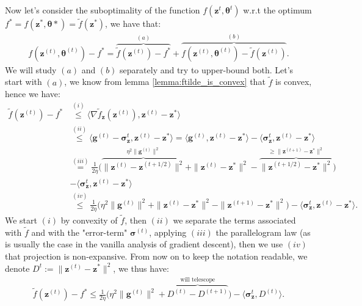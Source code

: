 Now let's consider the suboptimality of the function $f(\bm{z}^{t},\bm{\theta}^t)$ w.r.t the optimum $f^*=f(\bm{z}^*,\bm{\theta}*)=\tilde{f}(\bm{z}^{*})$, we have that:
\begin{align*}
    f(\bm{z}^{(t)},\bm{\theta}^{(t)}) - f^* = 
    \overbrace{\tilde{f}(\bm{z}^{(t)}) - f^* }^{(a)}
    + \overbrace{f(\bm{z}^{(t)},\bm{\theta}^{(t)}) - \tilde{f}(\bm{z}^{(t)})}^{(b)}.
\end{align*}
We will study $(a)$ and $(b)$ separately and try to upper-bound both. Let's start with $(a)$, we know from lemma \ref{lemma:ftilde_is_convex} that $\tilde{f}$ is convex, hence we have:
\begin{align*}
    \tilde{f}(\bm{z}^{(t)}) - f^* & \stackrel{(i)}{\leq} 
     \langle  \nabla \tilde{f}_{\bm{z}} (\bm{z}^{(t)}) 
    , \bm{z}^{(t)} - \bm{z}^* \rangle \\
    & \stackrel{(ii)}{\leq} 
    \langle  \bm{g}^{(t)} -\bm{\sigma}_{\bm{z}}^{t}
    , \bm{z}^{(t)} - \bm{z}^* \rangle 
    = 
    \langle  \bm{g}^{(t)} 
    , \bm{z}^{(t)} - \bm{z}^* \rangle 
    - \langle \bm{\sigma}_{\bm{z}}^{t}
    , \bm{z}^{(t)} - \bm{z}^* \rangle \\
    & \stackrel{(iii)}{=} 
    \frac{1}{2\eta} \Big( 
        \overbrace{ \|\bm{z}^{(t)} - \bm{z}^{(t+1/2)} \|^2}^{
         \eta^2\|\bm{g}^{(t)}\|^2
        }
         + \|\bm{z}^{(t)} - \bm{z}^* \|^2
         - \overbrace{\|\bm{z}^{(t+1/2)} - \bm{z}^* \|^2}^{
             \geq \|\bm{z}^{(t+1)} - \bm{z}^* \|^2 
         } 
     \Big) \\
    &- \langle \bm{\sigma}_{\bm{z}}^{t}
    , \bm{z}^{(t)} - \bm{z}^* \rangle \\
    & \stackrel{(iv)}{\leq} 
    \frac{1}{2\eta} \Big( 
         \eta^2\|\bm{g}^{(t)}\|^2
         + \|\bm{z}^{(t)} - \bm{z}^* \|^2
             - \|\bm{z}^{(t+1)} - \bm{z}^* \|^2 
     \Big) 
    - \langle \bm{\sigma}_{\bm{z}}^{t}
    , \bm{z}^{(t)} - \bm{z}^* \rangle. 
\end{align*}
We start $(i)$ by convexity of $\tilde{f}$, then $(ii)$ we separate the terms associated with $\tilde{f}$ and with the "error-term" $\bm{\sigma}^{(t)}$, applying $(iii)$ the parallelogram law (as is usually the case in the vanilla analysis of gradient descent), then we use $(iv)$ that projection is non-expansive. From now on to keep the notation readable, we denote $D^{t} :=\|\bm{z}^{(t)} - \bm{z}^* \|^2$, we thus have:
\begin{align*}
    \tilde{f}(\bm{z}^{(t)}) - f^* \leq 
    \frac{1}{2\eta} \Big( 
         \eta^2\|\bm{g}^{(t)}\|^2
         + \overbrace{D^{(t)} - D^{(t+1)}}^\text{will telescope}
     \Big) 
    - \langle \bm{\sigma}_{\bm{z}}^{t}, D^{(t)} \rangle.
\end{align*}

